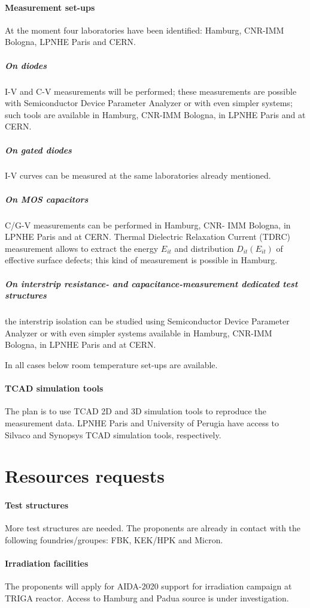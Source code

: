 \documentclass[dvips,12pt]{article}
\begin{document}
\paragraph{Measurement set-ups} At the moment four laboratories have been identified: Hamburg, CNR-IMM Bologna, LPNHE Paris and CERN.

\subparagraph{On diodes} I-V and C-V measurements will be performed; these 
measurements are possible with Semiconductor Device Parameter Analyzer or 
with even simpler systems; such tools are available in Hamburg, CNR-IMM Bologna, in LPNHE Paris
and at CERN. 

\subparagraph{On gated diodes} I-V curves can be measured at the same laboratories
 already mentioned.

\subparagraph{On MOS capacitors}  C/G-V measurements can be performed in Hamburg, CNR-
IMM Bologna, in  LPNHE Paris and at CERN. Thermal Dielectric Relaxation Current (TDRC) 
measurement allows to extract the energy 
 $E_{it}$ and distribution  $D_{it}(E_{it})$ of effective surface defects; this kind of measurement 
 is possible in Hamburg.

\subparagraph{On  interstrip resistance- and capacitance-measurement dedicated test structures} 
the interstrip isolation  can be studied  using 
Semiconductor Device Parameter Analyzer or with even simpler systems available in Hamburg, CNR-IMM Bologna, in LPNHE Paris
and at CERN. 

\noindent In all cases below room temperature set-ups are available.

\paragraph{TCAD simulation tools}The plan is to use TCAD 2D and 3D simulation tools 
to reproduce the measurement data. LPNHE Paris and University of Perugia have access to 
Silvaco and Synopsys TCAD simulation tools, respectively. 

\section{Resources requests}

\paragraph{Test structures}More test structures are needed. The proponents are already 
in contact with the following foundries/groupes: FBK, KEK/HPK and Micron.
\paragraph{Irradiation facilities}The proponents will apply for AIDA-2020 support for irradiation 
campaign at TRIGA reactor. Access to Hamburg and Padua source is under investigation.
\end{document}
